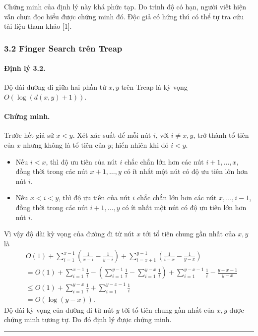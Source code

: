 \documentclass[11pt]{article}
\newcommand{\qedmark}{\hfill\rule{0.7ex}{0.7ex}}
\begin{document}
Chứng minh của định lý này khá phức tạp. Do trình độ có hạn, người viết hiện
vẫn chưa đọc hiểu được chứng minh đó. Độc giả có hứng thú có thể tự tra cứu tài
liệu tham khảo [1].

\subsubsection*{3.2 Finger Search trên Treap}

\paragraph{Định lý 3.2.}
Độ dài đường đi giữa hai phần tử \(x,y\) trên Treap là kỳ vọng
\(O(\log(d(x,y)+1))\).

\paragraph{Chứng minh.}
Trước hết giả sử \(x<y\). Xét xác suất để mỗi nút \(i\), với \(i\ne x,y\), trở
thành tổ tiên của \(x\) nhưng không là tổ tiên của \(y\); hiển nhiên khi đó
\(i<y\).

\begin{itemize}
  \item Nếu \(i<x\), thì độ ưu tiên của nút \(i\) chắc chắn lớn hơn các nút
  \(i+1,\ldots,x\), đồng thời trong các nút \(x+1,\ldots,y\) có ít nhất một nút
  có độ ưu tiên lớn hơn nút \(i\).
  \item Nếu \(x<i<y\), thì độ ưu tiên của nút \(i\) chắc chắn lớn hơn các nút
  \(x,\ldots,i-1\), đồng thời trong các nút \(i+1,\ldots,y\) có ít nhất một nút
  có độ ưu tiên lớn hơn nút \(i\).
\end{itemize}

Vì vậy độ dài kỳ vọng của đường đi từ nút \(x\) tới tổ tiên chung gần nhất của
\(x,y\) là
\[
\begin{aligned}
  &O(1)+
    \sum_{i=1}^{x-1}\left(\frac{1}{x-i}-\frac{1}{y-i}\right)
    +\sum_{i=x+1}^{y-1}\left(\frac{1}{i-x}-\frac{1}{y-x}\right)\\
  &=O(1)+\sum_{i=1}^{x-1}\frac{1}{i}
    -\left(\sum_{i=1}^{y-1}\frac{1}{i}-\sum_{i=1}^{y-x}\frac{1}{i}\right)
    +\sum_{i=1}^{y-x-1}\frac{1}{i}-\frac{y-x-1}{y-x}\\
  &\le O(1)+\sum_{i=1}^{y-x}\frac{1}{i}
    +\sum_{i=1}^{y-x-1}\frac{1}{i}\\
  &=O(\log(y-x)).
\end{aligned}
\]
Độ dài kỳ vọng của đường đi từ nút \(y\) tới tổ tiên chung gần nhất của \(x,y\)
được chứng minh tương tự. Do đó định lý được chứng minh. \qedmark
\end{document}
